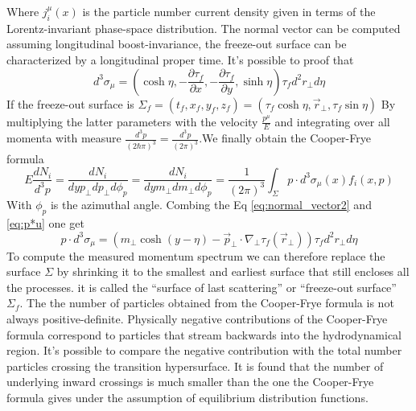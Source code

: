 \documentclass[12pt,a4paper]{book}
\begin{document}
	Where $j_i^\mu(x)$ is the particle number current density given in terms of the Lorentz-invariant phase-space distribution. The normal vector can be computed assuming longitudinal boost-invariance, the freeze-out surface can be characterized by a longitudinal proper time. It's possible to proof that
	\begin{equation}
		d^3 \sigma_\mu=\left(\cosh \eta ,-\frac{\partial \tau_f}{\partial x},-\frac{\partial \tau_f}{\partial y},\sinh\eta \right) \tau_f d^2 r_\perp d\eta
		\label{eq:normal_vector2}
	\end{equation}
	If the freeze-out surface is $\Sigma_f=(t_f,x_f,y_f,z_f)=(\tau_f \cosh \eta, \vec{r}_\perp,\tau_f \sin \eta)$
	By multiplying the latter parameters with the velocity $\frac{p^\mu}{E}$ and integrating over all momenta with measure $\frac{d^3 p}{(2\hbar\pi)^3}=\frac{d^3 p}{(2\pi)^3}$.We finally obtain the Cooper-Frye formula
	\begin{equation}
		\boxed{
			E \frac{dN_i}{d^3 p}= \frac{dN_i}{dy p_\perp dp_\perp d\phi_p} = \frac{dN_i}{dy m_\perp dm_\perp d\phi_p} = \frac{1}{(2\pi)^3} \int_{\Sigma} p \cdot d^3 \sigma_\mu (x) f_i (x,p) 
		}
		\label{eq:cooper-frye}
	\end{equation}
	With $\phi_p$ is the azimuthal angle. Combing the Eq \ref{eq:normal_vector2} and \ref{eq:p*u} one get
	\begin{equation}
		p \cdot d^3 \sigma_\mu= \left(m_\perp \cosh(y-\eta) -\vec{p}_\perp \cdot \nabla_\perp \tau_f(\vec{r}_\perp) \right) \tau_f d^2 r_\perp d\eta
	\end{equation}
	To compute the measured momentum spectrum we can therefore replace the surface $\Sigma$ by shrinking it to the smallest and earliest surface that still encloses all the processes. it is called the “surface of last scattering” or “freeze-out surface” $\Sigma_f$. The the number of particles obtained from the Cooper-Frye formula is not always positive-definite. Physically negative contributions of the Cooper-Frye formula correspond to particles that stream backwards into the hydrodynamical region. It's possible to compare the negative contribution with the total number particles crossing the transition hypersurface. It is found that the number of underlying inward crossings is much smaller than the one the Cooper-Frye formula gives under the assumption of equilibrium distribution functions. \cite{Cooper-Frye}
	
\end{document}
